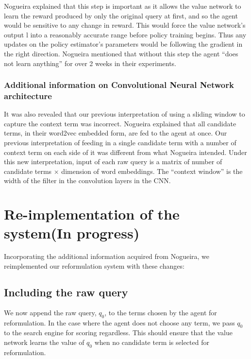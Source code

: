 Nogueira explained that this step is important as it allows the value network to learn the reward produced by only the original query at first, and so the agent would be sensitive to any change in reward. This would force the value network's output l into a reasonably accurate range before policy training begins. Thus any updates on the policy estimator’s parameters would be following the gradient in the right direction. Nogueira mentioned that without this step the agent ``does not learn anything” for over 2 weeks in their experiments.   

\subsubsection{Additional information on Convolutional Neural Network architecture}

It was also revealed that our previous interpretation of using a sliding window to capture the context term was incorrect. Nogueira explained that all candidate terms, in their word2vec embedded form, are fed to the agent at once. Our previous interpretation of feeding in a single candidate term with a number of context term on each side of it was different from what Nogueira intended. Under this new interpretation, input of each raw query is a matrix of number of candidate terms $\times$ dimension of word embeddings. The ``context window'' is the width of the filter in the convolution layers in the CNN. 




\section{Re-implementation of the system(In progress)}

Incorporating the additional information acquired from Nogueira, we reimplemented our reformulation system with these changes:


\subsection{Including the raw query}
We now append the raw query, $q_0$, to the terms chosen by the agent for reformulation. In the case where the agent does not choose any term, we pass $q_0$ to the search engine for scoring regardless. This should ensure that the value network learns the value of $q_0$ when no candidate term is selected for reformulation.
